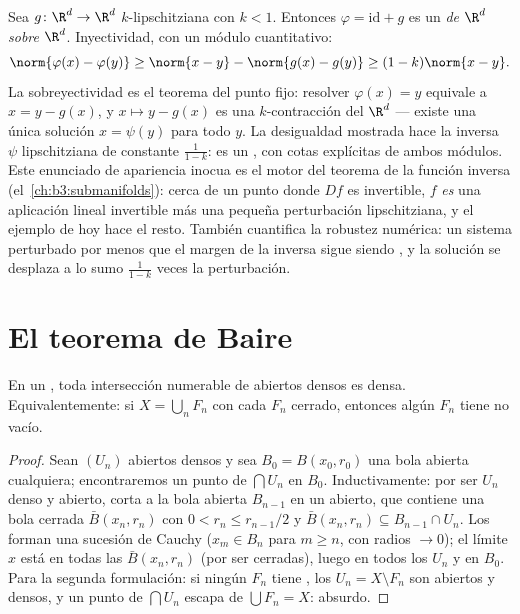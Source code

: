 \begin{example}
\label{ex:b3:complete:perturbident}
Sea $g \colon \R^d \to \R^d$ $k$-lipschitziana con $k < 1$. Entonces
$\varphi = \mathrm{id} + g$ es un
\emph{ de $\R^d$ sobre
$\R^d$}. Inyectividad, con un módulo cuantitativo:
\[
\norm{\varphi(x) - \varphi(y)} \geq \norm{x - y} -
\norm{g(x) - g(y)} \geq (1 - k)\norm{x - y} .
\]
La sobreyectividad es el teorema del punto fijo: resolver
$\varphi(x) = y$ equivale a $x = y - g(x)$, y $x \mapsto y -
g(x)$ es una $k$-contracción del
 $\R^d$ --- existe una única
solución $x = \psi(y)$ para todo $y$. La desigualdad mostrada hace la
inversa $\psi$ lipschitziana de constante $\frac1{1-k}$: es un
, con cotas explícitas
de ambos módulos. Este enunciado de apariencia inocua es el motor del
teorema de la función inversa (el~\cref{ch:b3:submanifolds}): cerca de
un punto donde $Df$ es invertible, $f$ \emph{es} una aplicación lineal
invertible más una pequeña perturbación lipschitziana, y el ejemplo de
hoy hace el resto. También cuantifica la robustez numérica: un sistema
perturbado por menos que el margen de la inversa sigue siendo
, y la solución se desplaza a
lo sumo $\frac{1}{1-k}$ veces la perturbación.
\end{example}

\section{El teorema de Baire}

\begin{theorem}[Baire]\label{thm:b3:complete:baire}
En un , toda
intersección numerable de abiertos
densos es densa. Equivalentemente: si $X = \bigcup_{n}F_n$ con cada
$F_n$ cerrado, entonces algún $F_n$ tiene
 no vacío.
\end{theorem}

\begin{proof}
Sean $(U_n)$ abiertos densos y sea $B_0 = B(x_0, r_0)$ una bola abierta
cualquiera; encontraremos un punto de $\bigcap U_n$ en $B_0$.
Inductivamente: por ser $U_{n}$ denso y abierto, corta a la bola abierta
$B_{n-1}$ en un abierto, que contiene
una bola cerrada $\bar B(x_n, r_n)$ con $0 < r_n \leq r_{n-1}/2$ y
$\bar B(x_n, r_n) \subseteq
B_{n-1}\cap U_n$. Los  forman una
sucesión de Cauchy ($x_m \in
B_n$ para $m \geq n$, con radios $\to 0$); el límite $x$ está en todas
las $\bar B(x_n, r_n)$ (por ser cerradas), luego en todos los $U_n$ y en
$B_0$. Para la segunda formulación: si ningún $F_n$ tiene
, los $U_n = X \setminus F_n$
son abiertos y densos, y un punto de $\bigcap U_n$ escapa de
$\bigcup F_n = X$: absurdo.
\end{proof}

